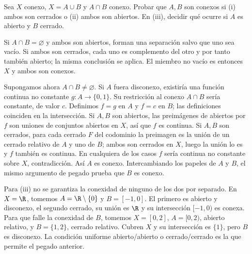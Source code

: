 \begin{ejercicio}\label{ej:lectura-17-5}
Sea $X$ conexo, $X=A\cup B$ y $A\cap B$ conexo. Probar que $A,B$ son conexos si (i) ambos son cerrados o (ii) ambos son abiertos. En (iii), decidir qué ocurre si $A$ es abierto y $B$ cerrado.
\end{ejercicio}
\begin{solucion}
Si $A\cap B=\varnothing$ y ambos son abiertos, forman una separación salvo que uno sea vacío. Si ambos son cerrados, cada uno es complemento del otro y por tanto también abierto; la misma conclusión se aplica. El miembro no vacío es entonces $X$ y ambos son conexos.

Supongamos ahora $A\cap B\ne\varnothing$. Si $A$ fuera disconexo, existiría una función continua no constante $g:A\to\{0,1\}$. Su restricción al conexo $A\cap B$ sería constante, de valor $c$. Definimos $f=g$ en $A$ y $f=c$ en $B$; las definiciones coinciden en la intersección. Si $A,B$ son abiertos, las preimágenes de abiertos por $f$ son uniones de conjuntos abiertos en $X$, así que $f$ es continua. Si $A,B$ son cerrados, para cada cerrado $F$ del codominio la preimagen es la unión de un cerrado relativo de $A$ y uno de $B$; ambos son cerrados en $X$, luego la unión lo es y $f$ también es continua. En cualquiera de los casos $f$ sería continua no constante sobre $X$, contradicción. Así $A$ es conexo. Intercambiando los papeles de $A$ y $B$, el mismo argumento de pegado prueba que $B$ es conexo.

Para (iii) no se garantiza la conexidad de ninguno de los dos por separado. En $X=\R$, tomemos $A=\R\setminus\{0\}$ y $B=[-1,0]$. El primero es abierto y disconexo, el segundo cerrado, su unión es $\R$ y su intersección $[-1,0)$ es conexa. Para que falle la conexidad de $B$, tomemos $X=[0,2]$, $A=[0,2)$, abierto relativo, y $B=\{1,2\}$, cerrado relativo. Cubren $X$ y su intersección es $\{1\}$, pero $B$ es disconexo. La condición uniforme abierto/abierto o cerrado/cerrado es la que permite el pegado anterior.
\end{solucion}


